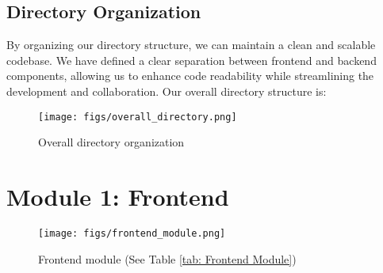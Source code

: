 \documentclass[conference]{IEEEtran}
\begin{document}
\subsection{Directory Organization}
By organizing our directory structure, we can maintain a clean and scalable codebase. We have defined a clear separation between frontend and backend components, allowing us to enhance code readability while streamlining the development and collaboration. Our overall directory structure is:
\begin{figure}[H]
\centering
\texttt{[image: figs/overall\_directory.png]}
\caption{Overall directory organization}
\label{fig:Overall directory organization}
\end{figure}
\section*{Module 1: Frontend}
\begin{figure}[H]
\centering
\texttt{[image: figs/frontend\_module.png]}
\caption{Frontend module (See Table \ref{tab: Frontend Module})}
\label{fig:Frontend module}
\end{figure}
\end{document}
